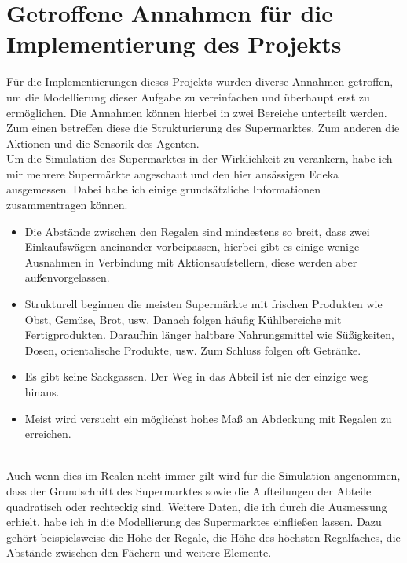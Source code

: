\newpage
\section{Getroffene Annahmen für die Implementierung des Projekts}
\label{annahmen}
Für die Implementierungen dieses Projekts wurden diverse Annahmen getroffen, um die Modellierung dieser Aufgabe zu vereinfachen und überhaupt erst zu ermöglichen. Die Annahmen können hierbei in zwei Bereiche unterteilt werden. Zum einen betreffen diese die Strukturierung des Supermarktes. Zum anderen die Aktionen und die Sensorik des Agenten.
\\
Um die Simulation des Supermarktes in der Wirklichkeit zu verankern, habe ich mir mehrere Supermärkte angeschaut und den hier ansässigen Edeka ausgemessen. Dabei habe ich einige grundsätzliche Informationen zusammentragen können.
\\
\begin{itemize}
	\item Die Abstände zwischen den Regalen sind mindestens so breit, dass zwei Einkaufswägen aneinander vorbeipassen, hierbei gibt es einige wenige Ausnahmen in Verbindung mit Aktionsaufstellern, diese werden aber außenvorgelassen.
	\item Strukturell beginnen die meisten Supermärkte mit frischen Produkten wie Obst, Gemüse, Brot, usw. Danach folgen häufig Kühlbereiche mit Fertigprodukten. Daraufhin länger haltbare Nahrungsmittel wie Süßigkeiten, Dosen, orientalische Produkte, usw. Zum Schluss folgen oft Getränke.
	\item Es gibt keine Sackgassen. Der Weg in das Abteil ist nie der einzige weg hinaus.
	\item Meist wird versucht ein möglichst hohes Maß an Abdeckung mit Regalen zu erreichen.
\end{itemize}
\noindent
\\
Auch wenn dies im Realen nicht immer gilt wird für die Simulation angenommen, dass der Grundschnitt des Supermarktes sowie die Aufteilungen der Abteile quadratisch oder rechteckig sind. Weitere Daten, die ich durch die Ausmessung erhielt, habe ich in die Modellierung des Supermarktes einfließen lassen. Dazu gehört beispielsweise die Höhe der Regale, die Höhe des höchsten Regalfaches, die Abstände zwischen den Fächern und weitere Elemente.
\\
